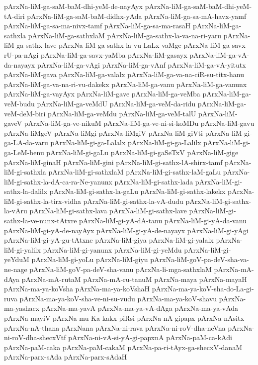 {pArxNa-liM-ga-saM-baM-dhi-yeM-de-nayAyx
pArxNa-liM-ga-saM-baM-dhi-yeM-tA-diri
pArxNa-liM-ga-saM-baM-didhx-yAda
pArxNa-liM-ga-sa-mA-havx-yamf
pArxNa-liM-ga-sa-ma-nivx-tamf
pArxNa-liM-ga-sa-ma-rasaH
pArxNa-liM-ga-sathxla
pArxNa-liM-ga-sathxlaM
pArxNa-liM-ga-sathx-la-va-na-ri-yaru
pArxNa-liM-ga-sathx-lave
pArxNa-liM-ga-sathx-la-vu-LaLx-vaMge
pArxNa-liM-ga-savx-rU-pa-nAgi
pArxNa-liM-ga-savx-yaMba
pArxNa-liM-gasayx
pArxNa-liM-ga-vA-da-nayayx
pArxNa-liM-ga-vAgi
pArxNa-liM-ga-vAnf
pArxNa-liM-ga-vA-yitutx
pArxNa-liM-gava
pArxNa-liM-ga-valalx
pArxNa-liM-ga-va-na-ciR-su-titx-hanu
pArxNa-liM-ga-va-na-ri-vu-dakekx
pArxNa-liM-ga-vanu
pArxNa-liM-ga-vanunx
pArxNa-liM-ga-vayAyx
pArxNa-liM-gave
pArxNa-liM-ga-veMba
pArxNa-liM-ga-veM-budu
pArxNa-liM-ga-veMdU
pArxNa-liM-ga-veM-da-ridu
pArxNa-liM-ga-veM-deM-biri
pArxNa-liM-ga-veMdu
pArxNa-liM-ga-veM-talU
pArxNa-liM-gaveV
pArxNa-liM-ga-ve-nikuM
pArxNa-liM-ga-ve-ni-si-koMDu
pArxNa-liM-gavu
pArxNa-liMgeV
pArxNa-liMgi
pArxNa-liMgiV
pArxNa-liM-giVti
pArxNa-liM-gi-ga-LA-da-varu
pArxNa-liM-gi-ga-Lalalx
pArxNa-liM-gi-ga-Lalilx
pArxNa-liM-gi-ga-LeM-benu
pArxNa-liM-gi-gaLu
pArxNa-liM-gi-gaSeTxV
pArxNa-liM-gige
pArxNa-liM-ginaH
pArxNa-liM-gini
pArxNa-liM-gi-sathx-lA-shirx-tamf
pArxNa-liM-gi-sathxla
pArxNa-liM-gi-sathxlaM
pArxNa-liM-gi-sathx-laM-gaLu
pArxNa-liM-gi-sathx-la-dA-ca-ra-Ne-yanunx
pArxNa-liM-gi-sathx-lada
pArxNa-liM-gi-sathx-la-dalilx
pArxNa-liM-gi-sathx-la-gaLu
pArxNa-liM-gi-sathx-lakekx
pArxNa-liM-gi-sathx-la-tirx-vidha
pArxNa-liM-gi-sathx-la-vA-dudu
pArxNa-liM-gi-sathx-la-vAru
pArxNa-liM-gi-sathx-lava
pArxNa-liM-gi-sathx-lave
pArxNa-liM-gi-sathx-la-ve-nunx-tAtxre
pArxNa-liM-gi-yA-dA-tanu
pArxNa-liM-gi-yA-da-vanu
pArxNa-liM-gi-yA-de-nayAyx
pArxNa-liM-gi-yA-de-nayayx
pArxNa-liM-gi-yAgi
pArxNa-liM-gi-yA-gu-tAtxne
pArxNa-liM-giya
pArxNa-liM-gi-yalalx
pArxNa-liM-gi-yalilx
pArxNa-liM-gi-yanunx
pArxNa-liM-gi-yeMdu
pArxNa-liM-gi-yeYduM
pArxNa-liM-gi-yoLu
pArxNa-liM-giyu
pArxNa-liM-goV-pa-deV-sha-va-ne-nage
pArxNa-liM-goV-pa-deV-sha-vanu
pArxNa-li-mga-sathxlaM
pArxNa-mA-dAya
pArxNa-mA-rutaM
pArxNa-mA-ru-tanuM
pArxNa-maya
pArxNa-mayaH
pArxNa-ma-ya-koVsha
pArxNa-ma-ya-koVshaH
pArxNa-ma-ya-koV-sha-do-La-gi-ruva
pArxNa-ma-ya-koV-sha-ve-ni-su-vudu
pArxNa-ma-ya-koV-shavu
pArxNa-ma-yashacx
pArxNa-ma-yavA
pArxNa-ma-ya-vA-dAga
pArxNa-ma-ya-vAda
pArxNa-mayiV
pArxNa-mu-Ka-kakx-piRsi
pArxNa-nA-gipapx
pArxNa-nAsitx
pArxNa-nA-thana
pArxNana
pArxNa-ni-rava
pArxNa-ni-roV-dha-neVna
pArxNa-ni-roV-dha-shecxVtf
pArxNa-ni-vA-si-yA-gi-papxnA
pArxNa-paM-ca-kAdi
pArxNa-paM-caka
pArxNa-paM-cakaM
pArxNa-pa-ri-tAyx-ga-shecxV-danaM
pArxNa-parx-sAda
pArxNa-parx-sAdaH
}
